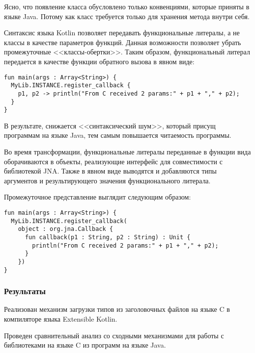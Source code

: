 Ясно, что появление класса  обусловлено только конвенциями, которые приняты в языке Java.
Потому как класс требуется только для хранения метода  внутри себя.

Синтаксис языка Kotlin позволяет передавать функциональные литералы, а не классы в качестве параметров функций.
Данная возможности позволяет убрать промежуточные <<классы-обертки>>.
Таким образом, функциональный литерал передается в качестве функции обратного вызова в явном виде:
\begin{lstlisting}[caption={Пример передачи функционального литерала в качестве функции обратного вызова.}, label=kotlin-callback-example]
fun main(args : Array<String>) {
  MyLib.INSTANCE.register_callback {
    p1, p2 -> println("From C received 2 params:" + p1 + "," + p2);
  }
}
\end{lstlisting}

В результате, снижается <<синтаксический шум>>, который присущ программам на языке Java, тем самым повышается читаемость программы.

Во время трансформации, функциональные литералы переданные в функции вида  оборачиваются в объекты, реализующие интерфейс  для совместимости с библиотекой JNA.
Также в явном виде выводятся и добавляются типы аргументов и результирующего значения функционального литерала.

Промежуточное представление выглядит следующим образом:
\begin{lstlisting}[caption={Промежуточное представление программы с трансформацией функции обратного вызова.}, label=transitional-callback-representation]
fun main(args : Array<String>) {
  MyLib.INSTANCE.register_callback(
    object : org.jna.Callback {
      fun callback(p1 : String, p2 : String) : Unit {
        println("From C received 2 params:" + p1 + "," + p2);
      }
    })
}
\end{lstlisting}

\subsubsection{Результаты}
Реализован механизм загрузки типов из заголовочных файлов на языке C в компиляторе языка Extensible Kotlin.

Проведен сравнительный анализ со сходными механизмами для работы с библиотеками на языке C из программ на языке Java.

